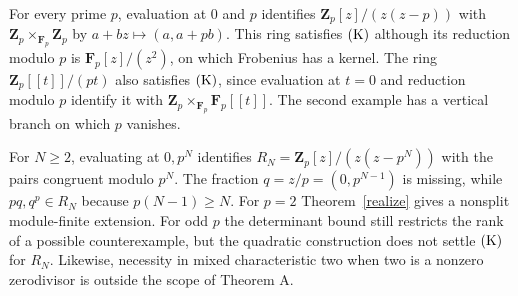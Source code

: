 \begin{example}
For every prime $p$, evaluation at $0$ and $p$ identifies
$\mathbf Z_p[z]/(z(z-p))$ with $\mathbf Z_p\times_{\mathbf F_p}\mathbf Z_p$ by $a+bz\mapsto(a,a+pb)$. This ring satisfies $\mathrm{(K)}$ although its reduction modulo $p$ is $\mathbf F_p[z]/(z^2)$, on which Frobenius has a kernel. The ring $\mathbf Z_p[[t]]/(pt)$ also satisfies $\mathrm{(K)}$, since evaluation at $t=0$ and reduction modulo $p$ identify it with $\mathbf Z_p\times_{\mathbf F_p}\mathbf F_p[[t]]$. The second example has a vertical branch on which $p$ vanishes.
\end{example}
\begin{example}
For $N\ge2$, evaluating at $0,p^N$ identifies $R_N=\mathbf Z_p[z]/(z(z-p^N))$ with the pairs congruent modulo $p^N$. The fraction $q=z/p=(0,p^{N-1})$ is missing, while $pq,q^p\in R_N$ because $p(N-1)\ge N$. For $p=2$ Theorem~\ref{realize} gives a nonsplit module-finite extension. For odd $p$ the determinant bound still restricts the rank of a possible counterexample, but the quadratic construction does not settle $\mathrm{(K)}$ for $R_N$. Likewise, necessity in mixed characteristic two when two is a nonzero zerodivisor is outside the scope of Theorem A.
\end{example}
